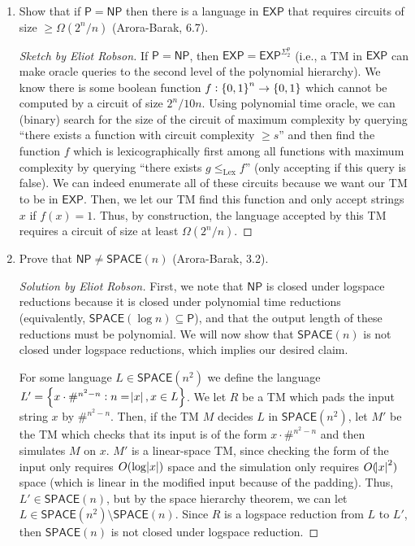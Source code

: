 \documentclass{article}
\newenvironment{sketch}[1]{\begin{proof}[Sketch by #1]}{\end{proof}}
\newenvironment{solution}[1]{\begin{proof}[Solution by #1]}{\end{proof}}
\newcommand{\EXP}{\mathsf{EXP}}
\newcommand{\NP}{\mathsf{NP}}
\newcommand{\Pe}{\mathsf{P}}
\newcommand{\SPACE}{\mathsf{SPACE}}
\begin{document}
\begin{enumerate}
    \item Show that if \(\Pe = \NP\) then there is a language in \(\EXP\) that requires circuits of size \(\geq \Omega(2^n / n)\) (Arora-Barak, 6.7).
    
    \begin{sketch}{Eliot Robson}
        If \(\Pe = \NP\), then \(\EXP = \EXP^{\Sigma_2^p}\) (i.e., a TM in \(\EXP\) can make oracle queries to the second level of the polynomial hierarchy). We know there is some boolean function \(f : \set{0,1}^n \to \set{0,1}\) which cannot be computed by a circuit of size \(2^n / 10n\). Using polynomial time oracle, we can (binary) search for the size of the circuit of maximum complexity by querying ``there exists a function with circuit complexity \(\geq s\)'' and then find the function \(f\) which is lexicographically first among all functions with maximum complexity by querying ``there exists \(g \leq_{\text{Lex}} f\)'' (only accepting if this query is false). We can indeed enumerate all of these circuits because we want our TM to be in \(\EXP\). Then, we let our TM find this function and only accept strings \(x\) if \(f(x) = 1\). Thus, by construction, the language accepted by this TM requires a circuit of size at least \(\Omega(2^n / n)\).
    \end{sketch}
    
    \item Prove that \(\NP \neq \SPACE(n)\) (Arora-Barak, 3.2).
    
    \begin{solution}{Eliot Robson}
        First, we note that \(\NP\) is closed under logspace reductions because it is closed under polynomial time reductions (equivalently, \(\SPACE(\log n) \subseteq \Pe\)), and that the output length of these reductions must be polynomial. We will now show that \(\SPACE(n)\) is not closed under logspace reductions, which implies our desired claim.
        
        For some language \(L \in \SPACE(n^2)\) we define the language \(L' = \set{x \cdot {\#^{n^2 - n}} : n = \abs{x}, x \in L}\). We let \(R\) be a TM which pads the input string \(x\) by \(\#^{n^2 - n}\). Then, if the TM \(M\) decides \(L\) in \(\SPACE(n^2)\), let \(M'\) be the TM which checks that its input is of the form \(x \cdot \#^{n^2 - n}\) and then simulates \(M\) on \(x\). \(M'\) is a linear-space TM, since checking the form of the input only requires \(O(\log \abs{x})\) space and the simulation only requires \(O(\abs{x}^2)\) space (which is linear in the modified input because of the padding). Thus, \(L' \in \SPACE(n)\), but by the space hierarchy theorem, we can let \(L \in \SPACE(n^2) \setminus \SPACE(n)\). Since \(R\) is a logspace reduction from \(L\) to \(L'\), then \(\SPACE(n)\) is not closed under logspace reduction.
    \end{solution}
\end{enumerate}
\end{document}
